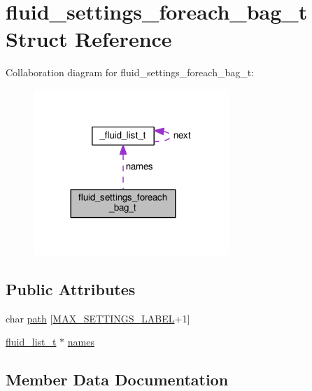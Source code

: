 \hypertarget{structfluid__settings__foreach__bag__t}{}\section{fluid\+\_\+settings\+\_\+foreach\+\_\+bag\+\_\+t Struct Reference}
\label{structfluid__settings__foreach__bag__t}


Collaboration diagram for fluid\+\_\+settings\+\_\+foreach\+\_\+bag\+\_\+t\+:
\nopagebreak
\begin{figure}[H]
\begin{center}
\leavevmode
\includegraphics[width=209pt]{structfluid__settings__foreach__bag__t__coll__graph}
\end{center}
\end{figure}
\subsection*{Public Attributes}
\begin{DoxyCompactItemize}
\item 
char \hyperlink{structfluid__settings__foreach__bag__t_ad85766a3a1a8c5d9b442ad68d689d9e0}{path} \mbox{[}\hyperlink{fluid__settings_8c_aecc2a070ed71497d75256b5c7704593d}{M\+A\+X\+\_\+\+S\+E\+T\+T\+I\+N\+G\+S\+\_\+\+L\+A\+B\+EL}+1\mbox{]}
\item 
\hyperlink{fluid__list_8h_a3ef7535d4290862c0af118569223bd89}{fluid\+\_\+list\+\_\+t} $\ast$ \hyperlink{structfluid__settings__foreach__bag__t_a22e9726c87ca4f35f4ff6040358a98bc}{names}
\end{DoxyCompactItemize}


\subsection{Member Data Documentation}
\mbox{\label{structfluid__settings__foreach__bag__t_a22e9726c87ca4f35f4ff6040358a98bc}} 
